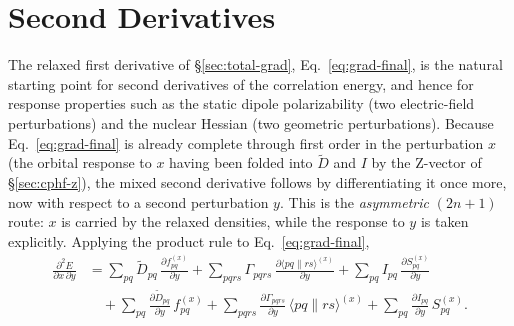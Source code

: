 \documentclass[12pt]{article}
\newcommand{\adb}[2]{\langle #1 \| #2 \rangle}
\begin{document}
\section{Second Derivatives}
\label{sec:second-derivs}

The relaxed first derivative of \S\ref{sec:total-grad}, Eq.~\eqref{eq:grad-final}, is the natural
starting point for second derivatives of the correlation energy, and hence for
response properties such as the static dipole polarizability (two electric-field
perturbations) and the nuclear Hessian (two geometric perturbations).  Because
Eq.~\eqref{eq:grad-final} is already complete through first order in the
perturbation $x$ (the orbital response to $x$ having been folded into $\tilde D$
and $I$ by the Z-vector of \S\ref{sec:cphf-z}), the mixed second derivative follows by
differentiating it once more, now with respect to a second perturbation $y$.
This is the {\em asymmetric} $(2n+1)$ route: $x$ is carried by the relaxed
densities, while the response to $y$ is taken explicitly.\cite{Stanton97}  Applying the product
rule to Eq.~\eqref{eq:grad-final},
\begin{align}
\frac{\partial^2 E}{\partial x\,\partial y}
&= \sum_{pq}\tilde D_{pq}\,\frac{\partial f^{(x)}_{pq}}{\partial y}
 + \sum_{pqrs}\Gamma_{pqrs}\,\frac{\partial \adb{pq}{rs}^{(x)}}{\partial y}
 + \sum_{pq} I_{pq}\,\frac{\partial S^{(x)}_{pq}}{\partial y}
\nonumber\\
&\quad
 + \sum_{pq}\frac{\partial \tilde D_{pq}}{\partial y}\,f^{(x)}_{pq}
 + \sum_{pqrs}\frac{\partial \Gamma_{pqrs}}{\partial y}\,\adb{pq}{rs}^{(x)}
 + \sum_{pq}\frac{\partial I_{pq}}{\partial y}\,S^{(x)}_{pq}.
\label{eq:d2E}
\end{align}
\end{document}
